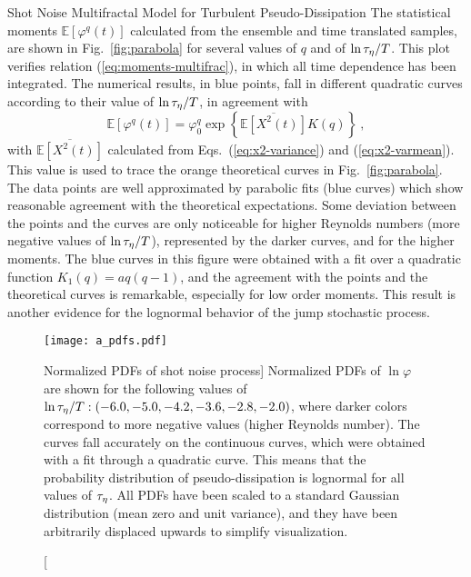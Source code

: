 \begin{chapter}{Shot Noise Multifractal Model for Turbulent Pseudo-Dissipation}
The statistical moments $\mathbb{E}[\varphi^q(t)]$ calculated from the ensemble and time translated samples, are shown in Fig.~\ref{fig:parabola} for several values of $q$ and of $\ln \tau_{\eta}/T$.
This plot verifies relation (\ref{eq:moments-multifrac}), in which all time dependence has been integrated.
The numerical results, in blue points, fall in different quadratic curves according to their value of $\ln\tau_{\eta}/T$, in agreement with
\begin{equation}
    \mathbb{E}[\varphi^q(t)] = \varphi_0^q \exp \left\{ \overline{\mathbb{E}[X^2(t)]} K(q) \right\} \ ,
\end{equation}
with $\overline{\mathbb{E}[X^2(t)]}$ calculated from Eqs.~(\ref{eq:x2-variance}) and (\ref{eq:x2-varmean}).
This value is used to trace the orange theoretical curves in Fig.~\ref{fig:parabola}.
The data points are well approximated by parabolic fits (blue curves) which show reasonable agreement with the theoretical expectations.
Some deviation between the points and the curves are only noticeable for higher Reynolds numbers (more negative values of $\ln \tau_{\eta}/T$), represented by the darker curves, and for the higher moments.
The blue curves in this figure were obtained with a fit over a quadratic function $K_1(q) = a q (q-1)$, and the agreement with the points and the theoretical curves is remarkable, especially for low order moments. This result is another evidence for the lognormal behavior of the jump stochastic process.

\begin{figure}[ht]
    \centering
    \texttt{[image: a\_pdfs.pdf]}
    \caption
    [Normalized PDFs of shot noise process]
    {Normalized PDFs of $\ln \varphi$ are shown for the following values of $\ln \tau_{\eta}/T: (-6.0, -5.0, -4.2, -3.6, -2.8, -2.0)$, where darker colors correspond to more negative values (higher Reynolds number).
    The curves fall accurately on the continuous curves, which were obtained with a fit through a quadratic curve. This means that the probability distribution of pseudo-dissipation is lognormal for all values of $\tau_{\eta}$. All PDFs have been scaled to a standard Gaussian distribution (mean zero and unit variance), and they have been arbitrarily displaced upwards to simplify visualization.
    }
    \label{fig:pdfs}
\end{figure}


\end{chapter}
